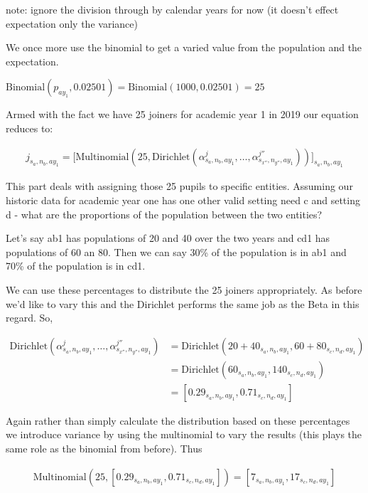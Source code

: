 \documentclass[margin=5mm]{article}
\begin{document}
note: ignore the division through by calendar years for now (it
doesn't effect expectation only the variance)

We once more use the binomial to get a varied value from the
population and the expectation.

$\text{Binomial}(p_{ay_1}, 0.02501) = \text{Binomial}(1000, 0.02501) = 25$

Armed with the fact we have 25 joiners for academic
year 1 in 2019 our equation reduces to:

\begin{equation*}
  \begin{split}
j_{s_a,n_b,ay_1} = \bigg[\text{Multinomial}(25, \text{Dirichlet}(\alpha^{j}_{s_a,n_b,ay_1}, \dots
, \alpha^{j''}_{s_{x''},n_{y''},ay_{1}}))\bigg]_{s_a,n_b,ay_1}
  \end{split}
\end{equation*}

This part deals with assigning those 25 pupils to specific entities.
Assuming our historic data for academic year one has one other valid
setting need c and setting d - what are the proportions of the
population between the two entities?

Let's say ab1 has populations of 20 and 40 over the two years and cd1
has populations of 60 an 80.  Then we can say 30\% of the population
is in ab1 and 70\% of the population is in cd1.

We can use these percentages to distribute the 25 joiners
appropriately.  As before we'd like to vary this and the Dirichlet
performs the same job as the Beta in this regard. So,

\begin{equation*}
  \begin{split}
\text{Dirichlet}(\alpha^{j}_{s_a,n_b,ay_1}, \dots,
\alpha^{j''}_{s_{x''},n_{y''},ay_{1}}) & =  \text{Dirichlet}(20 +
40_{s_a,n_b,ay_1}, 60 + 80_{s_c,n_d,ay_1}) \\
& = \text{Dirichlet}(60_{s_a,n_b,ay_1}, 140_{s_c,n_d,ay_1}) \\
& = [0.29_{s_a,n_b,ay_1}, 0.71_{s_c,n_d,ay_1}]
  \end{split}
\end{equation*}

Again rather than simply calculate the distribution based on these
percentages we introduce variance by using the multinomial to vary the
results (this plays the same role as the binomial from before).  Thus

\begin{equation*}
  \begin{split}
\text{Multinomial}(25, [0.29_{s_a,n_b,ay_1}, 0.71_{s_c,n_d,ay_1}]) = [
7_{s_a,n_b,ay_1}, 17_{s_c,n_d,ay_1}]
  \end{split}
\end{equation*}
\end{document}

